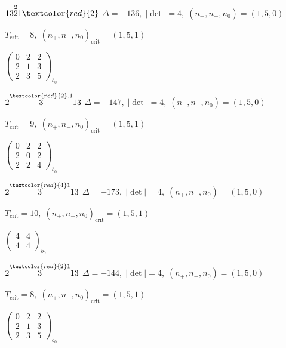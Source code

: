 \documentclass[10pt]{article}
\begin{document}
$13\overset{2}{2}1\textcolor{red}{2}$ \quad $\Delta=-136,\; |\det|=4,\; (n_+,n_-,n_0)=(1,5,0)$

\hspace{1em}$T_{\text{crit}}=8,\; (n_+,n_-,n_0)_{\text{crit}}=(1,5,1)$

\hspace{2em}$\left(\begin{smallmatrix}0 & 2 & 2 \\ 2 & 1 & 3 \\ 2 & 3 & 5\end{smallmatrix}\right)_{\!b_0}$

\smallskip

$2\overset{\textcolor{red}{2},1}{3}13$ \quad $\Delta=-147,\; |\det|=4,\; (n_+,n_-,n_0)=(1,5,0)$

\hspace{1em}$T_{\text{crit}}=9,\; (n_+,n_-,n_0)_{\text{crit}}=(1,5,1)$

\hspace{2em}$\left(\begin{smallmatrix}0 & 2 & 2 \\ 2 & 0 & 2 \\ 2 & 2 & 4\end{smallmatrix}\right)_{\!b_0}$

$2\overset{\textcolor{red}{4}1}{3}13$ \quad $\Delta=-173,\; |\det|=4,\; (n_+,n_-,n_0)=(1,5,0)$

\hspace{1em}$T_{\text{crit}}=10,\; (n_+,n_-,n_0)_{\text{crit}}=(1,5,1)$

\hspace{2em}$\left(\begin{smallmatrix}4 & 4 \\ 4 & 4\end{smallmatrix}\right)_{\!b_0}$

$2\overset{\textcolor{red}{2}1}{3}13$ \quad $\Delta=-144,\; |\det|=4,\; (n_+,n_-,n_0)=(1,5,0)$

\hspace{1em}$T_{\text{crit}}=8,\; (n_+,n_-,n_0)_{\text{crit}}=(1,5,1)$

\hspace{2em}$\left(\begin{smallmatrix}0 & 2 & 2 \\ 2 & 1 & 3 \\ 2 & 3 & 5\end{smallmatrix}\right)_{\!b_0}$

\smallskip
\end{document}

